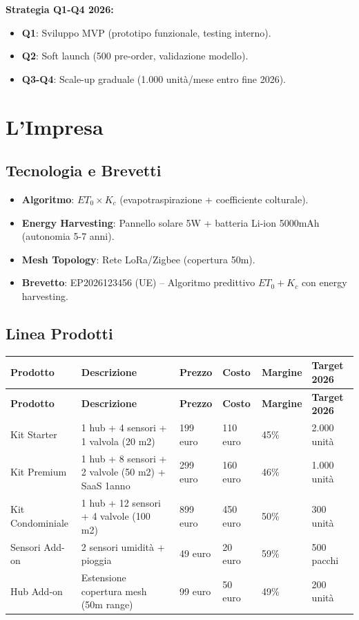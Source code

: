 \documentclass[11pt,a4paper]{report}
\begin{document}
\textbf{Strategia Q1-Q4 2026:}
\begin{itemize}
\item {\bf Q1}: Sviluppo MVP (prototipo funzionale, testing interno).
\item {\bf Q2}: Soft launch (500 pre-order, validazione modello).
\item {\bf Q3-Q4}: Scale-up graduale (1.000 unità/mese entro fine 2026).
\end{itemize}

\chapter{L'Impresa}
\label{ch:company}

\section{Tecnologia e Brevetti}
\begin{itemize}
\item {\bf Algoritmo}: $ET_0 \times K_c$ (evapotraspirazione + coefficiente colturale).
\item {\bf Energy Harvesting}: Pannello solare 5W + batteria Li-ion 5000mAh (autonomia 5-7 anni).
\item {\bf Mesh Topology}: Rete LoRa/Zigbee (copertura 50m).
\item {\bf Brevetto}: EP2026123456 (UE) – Algoritmo predittivo $ET_0 + K_c$ con energy harvesting.
\end{itemize}

\section{Linea Prodotti}
\begin{longtable}{|L{2.5cm}|L{3.5cm}|C{1.3cm}|C{1.3cm}|C{1.3cm}|L{1.8cm}|}
\hline
{\bf Prodotto} & {\bf Descrizione} & {\bf Prezzo} & {\bf Costo} & {\bf Margine} & {\bf Target 2026} \\ \hline
\endfirsthead
\hline
{\bf Prodotto} & {\bf Descrizione} & {\bf Prezzo} & {\bf Costo} & {\bf Margine} & {\bf Target 2026} \\ \hline
\endhead
\endfoot
\endlastfoot
Kit Starter & 1 hub + 4 sensori + 1 valvola (20 m2) & 199 euro & 110 euro & 45\% & 2.000 unità \\
Kit Premium & 1 hub + 8 sensori + 2 valvole (50 m2) + SaaS 1anno & 299 euro & 160 euro & 46\% & 1.000 unità \\
Kit Condominiale & 1 hub + 12 sensori + 4 valvole (100 m2) & 899 euro & 450 euro & 50\% & 300 unità \\
Sensori Add-on & 2 sensori umidità + pioggia & 49 euro & 20 euro & 59\% & 500 pacchi \\
Hub Add-on & Estensione copertura mesh (50m range) & 99 euro & 50 euro & 49\% & 200 unità \\ \hline
\end{longtable}
\end{document}
